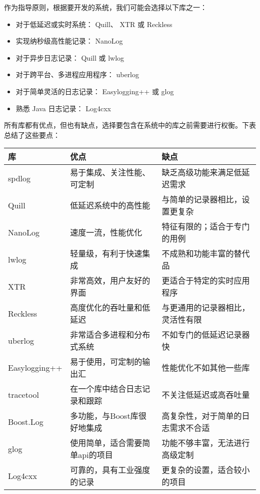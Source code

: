 作为指导原则，根据要开发的系统，我们可能会选择以下库之一：

\begin{itemize}
\item
对于低延迟或实时系统： Quill、 XTR 或 Reckless

\item
实现纳秒级高性能记录： NanoLog

\item
对于异步日志记录： Quill 或 lwlog

\item
对于跨平台、多进程应用程序： uberlog

\item
对于简单灵活的日志记录： Easylogging++ 或 glog

\item
熟悉 Java 日志记录： Log4cxx
\end{itemize}

所有库都有优点，但也有缺点，选择要包含在系统中的库之前需要进行权衡。下表总结了这些要点：

\begin{longtable}{|l|l|l|}
\hline
\textbf{库}    & \textbf{优点}         & \textbf{缺点}               \\ \hline
\endfirsthead
%
\endhead
%
spdlog        & 易于集成、关注性能、可定制       & 缺乏高级功能来满足低延迟需求         \\ \hline
Quill         & 低延迟系统中的高性能          & 与简单的记录器相比，设置更复杂        \\ \hline
NanoLog       & 速度一流，性能优化           & 特征有限的；适合于专门的用例            \\ \hline
lwlog         & 轻量级，有利于快速集成         & 不成熟和功能丰富的替代品              \\ \hline
XTR           & 非常高效，用户友好的界面        & 更适合于特定的实时应用程序             \\ \hline
Reckless      & 高度优化的吞吐量和低延迟        & 与更通用的记录器相比，灵活性有限          \\ \hline
uberlog       & 非常适合多进程和分布式系统       & 不如专门的低延迟记录器快              \\ \hline
Easylogging++ & 易于使用，可定制的输出汇        & 性能优化不如其他一些库               \\ \hline
tracetool     & 在一个库中结合日志记录和跟踪      & 不关注低延迟或高吞吐量               \\ \hline
Boost.Log     & 多功能，与Boost库很好地集成    & 高复杂性，对于简单的日志需求不合适 \\ \hline
glog          & 使用简单，适合需要简单api的项目   & 功能不够丰富，无法进行高级定制           \\ \hline
Log4cxx       & 可靠的，具有工业强度的记录 & 更复杂的设置，适合较小的项目         \\ \hline
\end{longtable}


